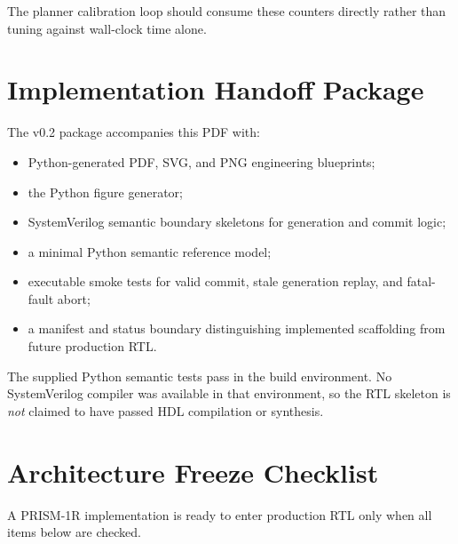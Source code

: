 \documentclass[10pt,letterpaper]{article}
\begin{document}
{{{The planner calibration loop should consume these counters directly rather than tuning against wall-clock time alone.

\section{Implementation Handoff Package}

The v0.2 package accompanies this PDF with:

\begin{itemize}
\item Python-generated PDF, SVG, and PNG engineering blueprints;
\item the Python figure generator;
\item SystemVerilog semantic boundary skeletons for generation and commit logic;
\item a minimal Python semantic reference model;
\item executable smoke tests for valid commit, stale generation replay, and fatal-fault abort;
\item a manifest and status boundary distinguishing implemented scaffolding from future production RTL.
\end{itemize}

The supplied Python semantic tests pass in the build environment. No SystemVerilog compiler was available in that environment, so the RTL skeleton is \emph{not} claimed to have passed HDL compilation or synthesis.

\section{Architecture Freeze Checklist}

A PRISM-1R implementation is ready to enter production RTL only when all items below are checked.

}}}
\end{document}
